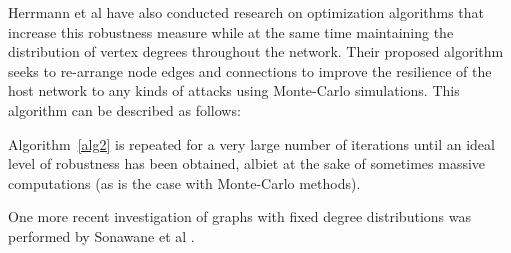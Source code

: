\documentclass[doc]{apa}%
\newcounter{numberedAlg}%
\newenvironment{numberedAlg}[1][]%
  {%
    \needspace{2\baselineskip}%
    \noindent \rule{\linewidth}{1pt} \endgraf%
    \refstepcounter{numberedAlg}%
    \centering \textsc{Algorithm}~\thenumberedAlg%
    \ifthenelse{\isempty{#1}}{}{:\ #1}%
  }{%
  \noindent \rule{\linewidth}{1pt}%
  }%
\begin{document}
Herrmann et al have also conducted research on optimization algorithms that increase this robustness measure while at the same time maintaining the distribution of vertex degrees throughout the network. Their proposed algorithm seeks to re-arrange node edges and connections to improve the resilience of the host network to any kinds of attacks using Monte-Carlo simulations. This algorithm can be described as follows:

Algorithm~\ref{alg2} is repeated for a very large number of iterations until an ideal level of robustness has been obtained, albiet at the sake of sometimes massive computations (as is the case with Monte-Carlo methods).


One more recent investigation of graphs with fixed degree distributions was performed by Sonawane et al \cite{bimodal}. 


\end{document}
